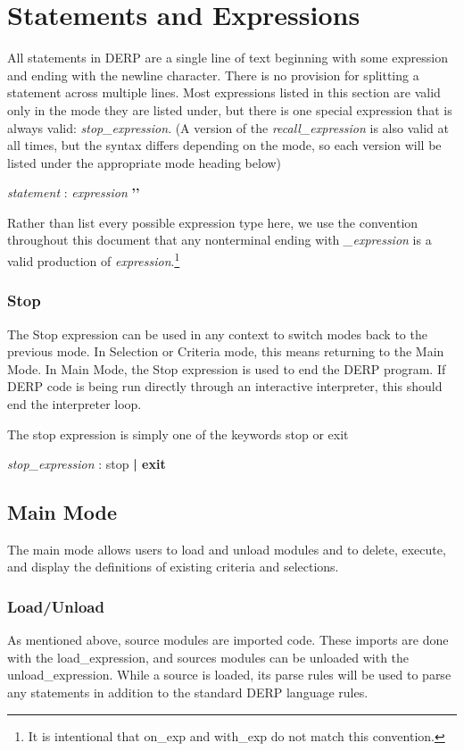 \section{Statements and Expressions}
All statements in DERP are a single line of text beginning with some expression 
and ending with the newline character. There is no provision for splitting a 
statement across multiple lines. Most expressions listed in this section are 
valid only in the mode they are listed under, but there is one special expression 
that is always valid: \emph{stop_expression}. (A version of the \emph{recall_expression} 
is also valid at all times, but the syntax differs depending on the mode, so each version 
will be listed under the appropriate mode heading below)
\begin{center}
    \emph{statement} : \emph{expression} \bf{'}\n\bf{'}
\end{center}

Rather than list every possible expression type here, we use the convention throughout 
this document that any nonterminal ending with \emph{_expression} is a valid production of 
\emph{expression}.\footnote{It is intentional that on_exp and with_exp do not match this convention.}

\subsubsection{Stop}
The Stop expression can be used in any context to switch modes back to the previous mode. In Selection 
or Criteria mode, this means returning to the Main Mode. In Main Mode, the Stop expression is used to 
end the DERP program. If DERP code is being run directly through an interactive interpreter, this should 
end the interpreter loop.

The stop expression is simply one of the keywords stop or exit
\begin{center}
    \emph{stop_expression} : stop \bf{|} exit
\end{center}

\subsection{Main Mode}
The main mode allows users to load and unload modules and to delete, execute, and display the definitions 
of existing criteria and selections.

\subsubsection{Load/Unload}
As mentioned above, source modules are imported code. These imports are done with the load_expression, 
and sources modules can be unloaded with the unload_expression. While a source is loaded, its parse 
rules will be used to parse any statements in addition to the standard DERP language rules.

